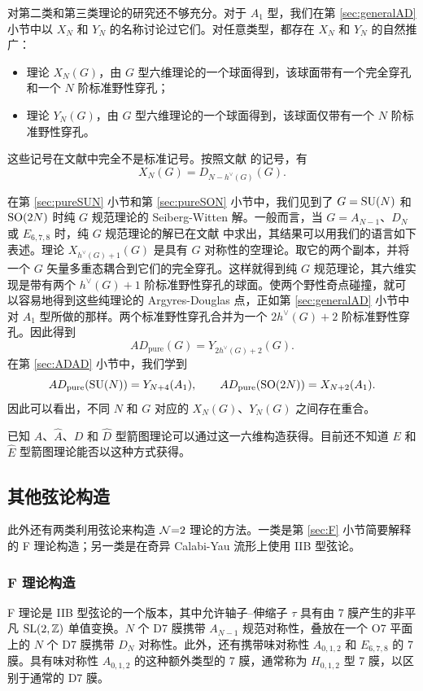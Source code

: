 对第二类和第三类理论的研究还不够充分。对于 $A_1$ 型，我们在第 \ref{sec:generalAD} 小节中以 $X_N$ 和 $Y_N$ 的名称讨论过它们。对任意类型，都存在 $X_N$ 和 $Y_N$ 的自然推广：
\begin{itemize}
\item 理论 $X_N(G)$，由 $G$ 型六维理论的一个球面得到，该球面带有一个完全穿孔和一个 $N$ 阶标准野性穿孔；
\item 理论 $Y_N(G)$，由 $G$ 型六维理论的一个球面得到，该球面仅带有一个 $N$ 阶标准野性穿孔。
\end{itemize}
这些记号在文献中完全不是标准记号。按照文献 \cite{Cecotti:2013lda} 的记号，有
\begin{equation}
X_N(G)=D_{N-h^\vee(G)}(G).\label{lda}
\end{equation}

在第 \ref{sec:pureSUN} 小节和第 \ref{sec:pureSON} 小节中，我们见到了 $G=\mathop{\mathrm{SU}}(N)$ 和 $\mathop{\mathrm{SO}}(2N)$ 时纯 $G$ 规范理论的 Seiberg-Witten 解。一般而言，当 $G=A_{N-1}$、$D_N$ 或 $E_{6,7,8}$ 时，纯 $G$ 规范理论的解已在文献 \cite{Martinec:1995by} 中求出，其结果可以用我们的语言如下表述。理论 $X_{h^\vee(G)+1}(G)$ 是具有 $G$ 对称性的空理论。取它的两个副本，并将一个 $G$ 矢量多重态耦合到它们的完全穿孔。这样就得到纯 $G$ 规范理论，其六维实现是带有两个 $h^\vee(G)+1$ 阶标准野性穿孔的球面。使两个野性奇点碰撞，就可以容易地得到这些纯理论的 Argyres-Douglas 点，正如第 \ref{sec:generalAD} 小节中对 $A_1$ 型所做的那样。两个标准野性穿孔合并为一个 $2h^\vee(G)+2$ 阶标准野性穿孔。因此得到
\begin{equation}
AD_\text{pure}(G)=Y_{2h^\vee(G)+2}(G).\label{ady}
\end{equation}
在第 \ref{sec:ADAD} 小节中，我们学到
\begin{equation}
AD_\text{pure}(\mathop{\mathrm{SU}}(N))=Y_{N+4}(A_1),\qquad
AD_\text{pure}(\mathop{\mathrm{SO}}(2N))=X_{N+2}(A_1).\label{ADDD}
\end{equation}
因此可以看出，不同 $N$ 和 $G$ 对应的 $X_N(G)$、$Y_N(G)$ 之间存在重合。

已知 $A$、$\hat A$、$D$ 和 $\hat D$ 型箭图理论可以通过这一六维构造获得。目前还不知道 $E$ 和 $\hat E$ 型箭图理论能否以这种方式获得。

\subsection{其他弦论构造}
此外还有两类利用弦论来构造 $\mathcal{N}{=}2$ 理论的方法。一类是第 \ref{sec:F} 小节简要解释的 F 理论构造；另一类是在奇异 Calabi-Yau 流形上使用 IIB 型弦论。

\subsubsection{F 理论构造}
F 理论是 IIB 型弦论的一个版本，其中允许轴子--伸缩子 $\tau$ 具有由 7 膜产生的非平凡 $\mathop{\mathrm{SL}}(2,\mathbb{Z})$ 单值变换。$N$ 个 D7 膜携带 $A_{N-1}$ 规范对称性，叠放在一个 O7 平面上的 $N$ 个 D7 膜携带 $D_N$ 对称性。此外，还有携带味对称性 $A_{0,1,2}$ 和 $E_{6,7,8}$ 的 7 膜。具有味对称性 $A_{0,1,2}$ 的这种额外类型的 7 膜，通常称为 $H_{0,1,2}$ 型 7 膜，以区别于通常的 D7 膜。

